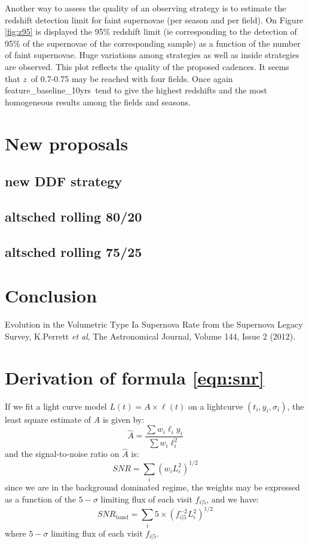 \documentclass [11pt,a4paper]{article}
\newcommand{\feature}{feature\_baseline\_10yrs}
\newcommand{\redshift}{$z$}
\begin{document}
Another way to assess the quality of an observing strategy is to estimate the redshift detection limit for faint supernovae (per season and per field). On Figure \ref{fig:z95} is displayed the 95\% redshift limit (ie corresponding to the detection of 95\% of the supernovae of the corresponding sample) as a function of the number of faint supernovae. Huge variations among strategies as well as inside strategies are observed. This plot reflects the quality of the proposed cadences. It seems that \redshift~of 0.7-0.75 may be reached with four fields. Once again \feature~tend to give the highest redshifts and the most homogeneous results among the fields and seasons. 

\section{New proposals}

\subsection{new DDF strategy}

\subsection{altsched rolling 80/20}

\subsection{altsched rolling 75/25}


\section{ Conclusion}

\begin{thebibliography}{9}
 Evolution in the Volumetric Type Ia Supernova Rate from the Supernova Legacy Survey, K.Perrett {\it et al}, The Astronomical Journal, Volume 144, Issue 2 (2012).
  
 \end{thebibliography}

\clearpage
\appendix
  



\section{Derivation of formula \ref{eqn:snr}}

\label{sec:snr}

If we fit a light curve model $L(t) = A \times \ell(t)$ on a
lightcurve $(t_i, y_i, \sigma_i)$, the least square estimate of $A$ is
given by:
$$
\hat{A} = \frac{\sum w_i \ell_i y_i}{\sum w_i \ell_i^2}
$$
and the signal-to-noise ratio on $\hat{A}$ is:
$$
SNR = \sum_i (w_i L_i^2)^{1/2}
$$ since we are in the background dominated regime, the weights may be
expressed as a function of the $5-\sigma$ limiting flux of each visit
$f_{i|5}$, and we have:
$$
SNR_{\mathrm{band}} = \sum_{i} 5 \times (f^{-2}_{i|5} L_i^2)^{1/2}
$$
where $5-\sigma$ limiting flux of each visit $f_{i|5}$.
\end{document}
